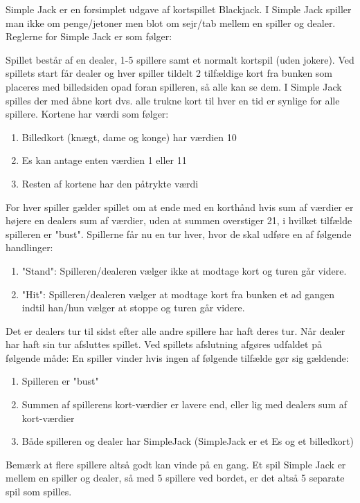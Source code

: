 Simple Jack er en forsimplet udgave af kortspillet Blackjack. I Simple Jack spiller man ikke om penge/jetoner men blot om sejr/tab mellem en spiller og dealer.  Reglerne for Simple Jack er som følger:

Spillet består af en dealer, 1-5 spillere samt et normalt kortspil (uden jokere). Ved spillets start får dealer og hver spiller tildelt 2 tilfældige kort fra bunken som placeres med billedsiden opad foran spilleren, så alle kan se dem. I Simple Jack spilles der med åbne kort dvs. alle trukne kort til hver en tid er synlige for alle spillere.  Kortene har værdi som følger:
\begin{enumerate}
\item Billedkort (knægt, dame og konge) har værdien 10
\item Es kan antage enten værdien 1 eller 11
\item Resten af kortene har den påtrykte værdi
\end{enumerate}
For hver spiller gælder spillet om at ende med en korthånd hvis sum af værdier er højere en dealers sum af værdier,  uden at summen overstiger 21, i hvilket tilfælde spilleren er "bust". Spillerne får nu en tur hver, hvor de skal udføre en af følgende handlinger:
\begin{enumerate}
\item "Stand": Spilleren/dealeren vælger ikke at modtage kort og turen går videre.
\item "Hit": Spilleren/dealeren vælger at modtage kort fra bunken et ad gangen indtil han/hun vælger at stoppe og turen går videre.
\end{enumerate}
Det er dealers tur til sidst efter alle andre spillere har haft deres tur. Når dealer har haft sin tur afsluttes spillet. Ved spillets afslutning afgøres udfaldet på følgende måde: En spiller vinder hvis ingen af følgende tilfælde gør sig gældende:
\begin{enumerate}
\item Spilleren er "bust"
\item Summen af spillerens kort-værdier er lavere end, eller lig med dealers sum af kort-værdier
\item Både spilleren og dealer har SimpleJack (SimpleJack er et Es og et billedkort)
\end{enumerate}
Bemærk at flere spillere altså godt kan vinde på en gang. Et spil Simple Jack er mellem en spiller og dealer, 
så med 5 spillere ved bordet, er det altså 5 separate spil som spilles.
